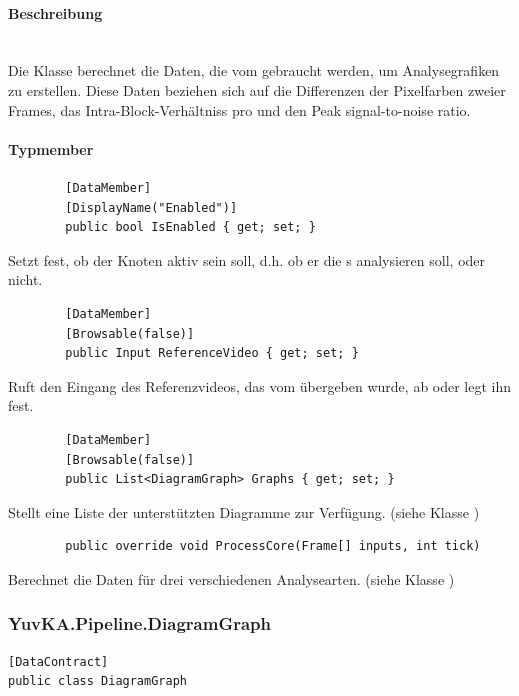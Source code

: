 \paragraph{Beschreibung}~\\
Die Klasse  berechnet die Daten, die vom  gebraucht werden, um Analysegrafiken zu erstellen. Diese Daten beziehen sich auf die Differenzen der Pixelfarben zweier Frames, das Intra-Block-Verhältniss pro  und den Peak signal-to-noise ratio.

\paragraph{Typmember}
\begin{itemize}

	\begin{verbatim}
		[DataMember]
		[DisplayName("Enabled")]
		public bool IsEnabled { get; set; }
	\end{verbatim}
	Setzt fest, ob der Knoten aktiv sein soll, d.h. ob er die s analysieren soll, oder nicht.
	
	\begin{verbatim}
		[DataMember]
		[Browsable(false)]
		public Input ReferenceVideo { get; set; }
	\end{verbatim}
	Ruft den Eingang des Referenzvideos, das vom  übergeben wurde, ab oder legt ihn fest.

	\begin{verbatim}
		[DataMember]
		[Browsable(false)]
		public List<DiagramGraph> Graphs { get; set; }
	\end{verbatim}
	Stellt eine Liste der unterstützten Diagramme zur Verfügung. (siehe Klasse )
	
	\begin{verbatim}
		public override void ProcessCore(Frame[] inputs, int tick)
	\end{verbatim}
	Berechnet die Daten für drei verschiedenen Analysearten. (siehe Klasse )
	
\end{itemize}

\subsubsection{YuvKA.Pipeline.DiagramGraph}
\begin{verbatim}
[DataContract]
public class DiagramGraph
\end{verbatim}

